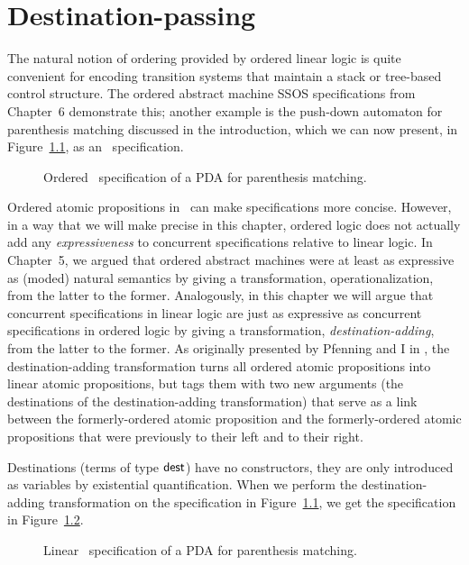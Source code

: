 \chapter{Destination-passing}
\label{chapter-destinations}

The natural notion of ordering provided by ordered linear logic is
quite convenient for encoding transition systems that maintain a stack
or tree-based control structure. The ordered abstract machine SSOS
specifications from Chapter~6 demonstrate this; another example is the
push-down automaton for parenthesis matching discussed in the
introduction, which we can now present, in Figure~\ref{fig:pda-ord},
as an \sls~specification.

\begin{figure}[ht]
\caption{Ordered \sls~specification of a PDA for parenthesis matching.}
\label{fig:pda-ord}
\end{figure}

Ordered atomic propositions in \sls~can make specifications more
concise. However, in a way that we will make precise in this chapter,
ordered logic does not actually add any {\it expressiveness} to
concurrent specifications relative to linear logic. In Chapter~5, we
argued that ordered abstract machines were at least as expressive as
(moded) natural semantics by giving a transformation,
operationalization, from the latter to the former. Analogously, in
this chapter we will argue that concurrent specifications in linear
logic are just as expressive as concurrent specifications in ordered
logic by giving a transformation, {\it destination-adding}, from the
latter to the former.  As originally presented by Pfenning and I in
\cite{simmons11logical}, the destination-adding transformation turns
all ordered atomic propositions into linear atomic propositions, but
tags them with two new arguments (the destinations of the
destination-adding transformation) that serve as a link between the
formerly-ordered atomic proposition and the formerly-ordered atomic
propositions that were previously to their left and to their right.

Destinations (terms of type ${\sf dest}$) have no constructors, they
are only introduced as variables by existential quantification.  When
we perform the destination-adding transformation on the specification
in Figure~\ref{fig:pda-ord}, we get the specification in
Figure~\ref{fig:pda-lin}.


\begin{figure}
\caption{Linear \sls~specification of a PDA for parenthesis matching.}
\label{fig:pda-lin}
\end{figure}

